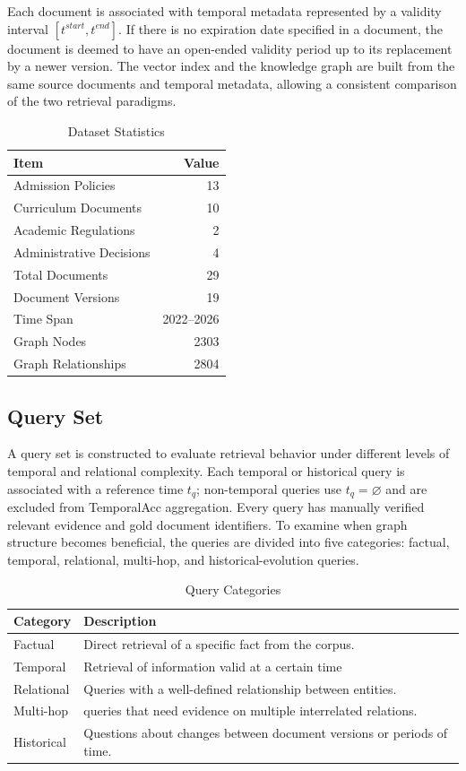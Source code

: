 \documentclass[conference]{IEEEtran}
\numberwithin{equation}{section}
\begin{document}
Each document is associated with temporal metadata represented by a validity interval $[t^{start},t^{end}]$. If there is no expiration date specified in a document, the document is deemed to have an open-ended validity period up to its replacement by a newer version. The vector index and the knowledge graph are built from the same source documents and temporal metadata, allowing a consistent comparison of the two retrieval paradigms.

\begin{table}[htbp]
\caption{Dataset Statistics}
\label{tab:dataset}
\centering
\begin{tabular}{lr}
\hline
\textbf{Item} & \textbf{Value} \\
\hline
Admission Policies & 13 \\
Curriculum Documents & 10 \\
Academic Regulations & 2 \\
Administrative Decisions & 4 \\
Total Documents & 29 \\
Document Versions & 19 \\
Time Span & 2022--2026 \\
Graph Nodes & 2303 \\
Graph Relationships & 2804 \\
\hline
\end{tabular}
\end{table}
\subsection{Query Set}

A query set is constructed to evaluate retrieval behavior under different levels of temporal and relational complexity. Each temporal or historical query is associated with a reference time $t_q$; non-temporal queries use $t_q=\varnothing$ and are excluded from TemporalAcc aggregation. Every query has manually verified relevant evidence and gold document identifiers. To examine when graph structure becomes beneficial, the queries are divided into five categories: factual, temporal, relational, multi-hop, and historical-evolution queries.

\begin{table}[htbp]
\caption{Query Categories}
\label{tab:query_categories}
\centering
\begin{tabular}{p{1.8cm}p{5.4cm}}
\hline
\textbf{Category} & \textbf{Description} \\
\hline
Factual & Direct retrieval of a specific fact from the corpus. \\
Temporal & Retrieval of information valid at a certain time \\ 
Relational & Queries with a well-defined relationship between entities. \\ 
Multi-hop & queries that need evidence on multiple interrelated relations. \\
Historical & Questions about changes between document versions or periods of time. \\
\hline
\end{tabular}
\end{table}
\end{document}
